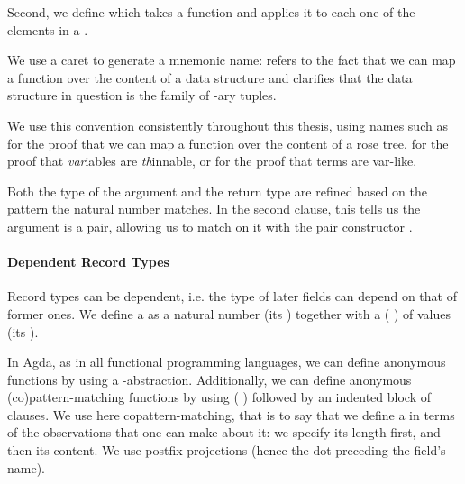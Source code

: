 
Second, we define  which takes a function and
applies it to each one of the elements in a .

\begin{convention}
We use a caret to generate a mnemonic name:  refers to the fact
that we can map a function over the content of a data structure and
 clarifies that the data structure in question is the family
of -ary tuples.

We use this convention consistently throughout this thesis, using names
such as  for the proof that we can map a
function over the content of a rose tree, 
for the proof that \emph{var}iables are \emph{th}innable,
or  for the proof that terms are var-like.
\end{convention}

Both the type of the  argument and the  return type are
refined based on the pattern the natural number matches. In the second clause,
this tells us the  argument is a pair, allowing us to match on it
with the pair constructor \AIC{\_,\_}.



\paragraph{Dependent Record Types}

Record types can be dependent, i.e. the type of later fields can depend on that of
former ones. We define a  as a natural number (its ) together
with a ( ) of values (its ).


In Agda, as in all functional programming languages, we can define anonymous functions
by using a -abstraction. Additionally, we can define anonymous (co)pattern-matching
functions by using ( ) followed by an indented block of clauses.
We use here copattern-matching, that is to say that we define a  in terms
of the observations that one can make about it: we specify its length first, and
then its content. We use postfix projections (hence the dot preceding the field's name).

